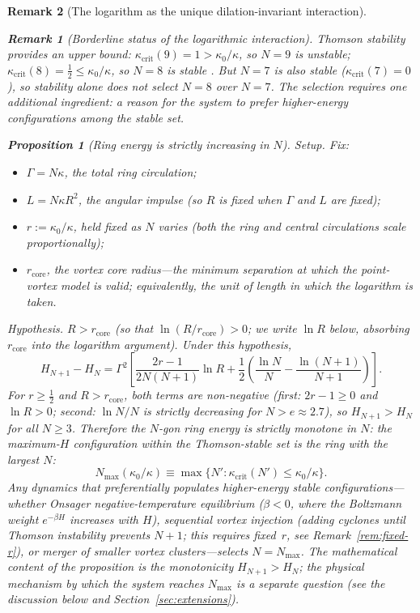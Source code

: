 \documentclass[12pt, a4paper]{article}
\newtheorem{proposition}[theorem]{Proposition}
\newtheorem{remark}{Remark}[section]
\numberwithin{equation}{section}
\begin{document}
\begin{remark}[The logarithm as the unique dilation-invariant interaction]
\begin{remark}[Borderline status of the logarithmic interaction]
Thomson stability provides an \emph{upper bound}:
$\kappa_{\mathrm{crit}}(9) = 1 > \kappa_0/\kappa$,
so $N = 9$ is unstable; $\kappa_{\mathrm{crit}}(8) = \tfrac{1}{2}
\le \kappa_0/\kappa$, so $N = 8$ is stable \citep{Adriani2018}.
But $N = 7$ is also stable ($\kappa_{\mathrm{crit}}(7) = 0$), so
stability alone does not select $N = 8$ over $N = 7$.
The selection requires one additional ingredient: a reason for the
system to prefer higher-energy configurations among the stable set.

\begin{proposition}[Ring energy is strictly increasing in $N$]\label{prop:onsager-n-select}
\emph{Setup.} Fix:
\begin{itemize}
  \item $\Gamma = N\kappa$, the total ring circulation;
  \item $L = N\kappa R^2$, the angular impulse (so $R$ is fixed
        when $\Gamma$ and $L$ are fixed);
  \item $r := \kappa_0/\kappa$, held fixed as $N$ varies (both
        the ring and central circulations scale proportionally);
  \item $r_{\mathrm{core}}$, the vortex core radius---the minimum
        separation at which the point-vortex model is valid;
        equivalently, the unit of length in which the logarithm
        is taken.
\end{itemize}
\emph{Hypothesis.} $R > r_{\mathrm{core}}$ (so that
$\ln(R/r_{\mathrm{core}}) > 0$; we write $\ln R$ below,
absorbing $r_{\mathrm{core}}$ into the logarithm argument).
Under this hypothesis,
\begin{equation}\label{eq:H-monotone}
  H_{N+1} - H_N = \Gamma^2\!\left[\frac{2r-1}{2N(N+1)}\ln R
    + \frac12\!\left(\frac{\ln N}{N} - \frac{\ln(N+1)}{N+1}\right)\right].
\end{equation}
For $r \ge \tfrac{1}{2}$ and $R > r_{\mathrm{core}}$, both terms
are non-negative (first: $2r - 1 \ge 0$ and $\ln R > 0$; second:
$\ln N/N$ is strictly decreasing for $N > e \approx 2.7$), so
$H_{N+1} > H_N$ for all $N \ge 3$.  Therefore the $N$-gon ring
energy is strictly monotone in $N$: the maximum-$H$ configuration
within the Thomson-stable set is the ring with the largest $N$:
\[
  N_{\max}(\kappa_0/\kappa)
    \equiv \max\bigl\{N' : \kappa_{\mathrm{crit}}(N') \le \kappa_0/\kappa\bigr\}.
\]
Any dynamics that preferentially populates higher-energy stable
configurations---whether Onsager negative-temperature equilibrium
($\beta < 0$, where the Boltzmann weight $e^{-\beta H}$ increases
with $H$), sequential vortex injection (adding cyclones until
Thomson instability prevents $N{+}1$; this requires fixed~$r$,
see Remark~\ref{rem:fixed-r}), or merger of smaller vortex
clusters---selects $N = N_{\max}$.  The mathematical content of the
proposition is the monotonicity $H_{N+1} > H_N$; the physical
mechanism by which the system reaches $N_{\max}$ is a separate
question (see the discussion below and Section~\ref{sec:extensions}).


\end{proposition}
\end{remark}
\end{remark}
\end{document}
